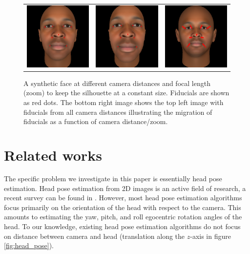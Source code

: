 \documentclass[runningheads]{llncs}
\begin{document}
\begin{figure}[ht]
\begin{tabular}{ccc}
\includegraphics[width=.25\linewidth]{resources/figures/extracted_fiducial_0005.png} &
\includegraphics[width=.25\linewidth]{resources/figures/extracted_fiducial_0007.png} &
\includegraphics[width=.25\linewidth]{resources/figures/fiducial_migration.png}
\end{tabular}
\caption{A synthetic face at different camera distances and focal length (zoom) to keep the silhouette at a constant size.  
Fiducials are shown as red dots.  
The bottom right image shows the top left image with fiducials from all camera distances illustrating the migration of fiducials as a function of camera distance/zoom.} 
\label{fig:fiducial_migration}
\end{figure}

\section{Related works}
The specific problem we investigate in this paper is essentially head pose estimation.  
Head pose estimation from 2D images is an active field of research, a recent survey can be found in \cite{murphy2009head}. 
However, most head pose estimation algorithms focus primarily on the orientation of the head with respect to the camera. 
This amounts to estimating the yaw, pitch, and roll egocentric rotation angles of the head. 
To our knowledge, existing head pose estimation algorithms do not focus on distance between camera and head (translation along the $z$-axis in figure \ref{fig:head_pose}).
\end{document}
